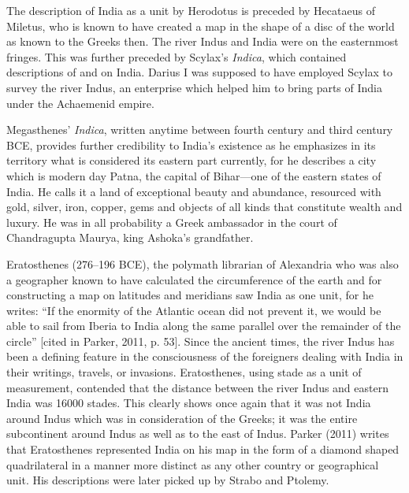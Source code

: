 The description of India as a unit by Herodotus is preceded by Hecataeus of Miletus, who is known to have created a map in the shape of a disc of the world as known to the Greeks then. The river Indus and India were on the easternmost fringes. This was further preceded by Scylax’s \textit{Indica}, which contained descriptions of and on India. Darius I was supposed to have employed Scylax to survey the river Indus, an enterprise which helped him to bring parts of India under the Achaemenid empire.

Megasthenes’ \textit{Indica}, written anytime between fourth century and third century BCE, provides further credibility to India’s existence as he emphasizes in its territory what is considered its eastern part currently, for he describes a city which is modern day Patna, the capital of Bihar—one of the eastern states of India. He calls it a land of exceptional beauty and abundance, resourced with gold, silver, iron, copper, gems and objects of all kinds that constitute wealth and luxury. He was in all probability a Greek ambassador in the court of Chandragupta Maurya, king Ashoka’s grandfather. 

Eratosthenes (276--196 BCE), the polymath librarian of Alexandria who was also a geographer known to have calculated the circumference of the earth and for constructing a map on latitudes and meridians saw India as one unit, for he writes: “If the enormity of the Atlantic ocean did not prevent it, we would be able to sail from Iberia to India along the same parallel over the remainder of the circle” [cited in Parker, 2011, p. 53]. Since the ancient times, the river Indus has been a defining feature in the consciousness of the foreigners dealing with India in their writings, travels, or invasions. Eratosthenes, using stade as a unit of measurement, contended that the distance between the river Indus and eastern India was 16000 stades. This clearly shows once again that it was not India around Indus which was in consideration of the Greeks; it was the entire subcontinent around Indus as well as to the east of Indus. Parker (2011) writes that Eratosthenes represented India on his map in the form of a diamond shaped quadrilateral in a manner more distinct as any other country or geographical unit. His descriptions were later picked up by Strabo and Ptolemy. 

